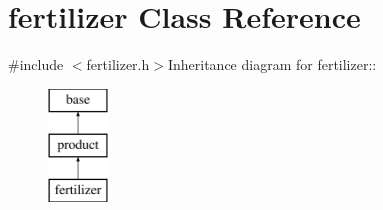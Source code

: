 \hypertarget{classfertilizer}{
\section{fertilizer Class Reference}
\label{classfertilizer}
}


{\ttfamily \#include $<$fertilizer.h$>$}Inheritance diagram for fertilizer::\begin{figure}[H]
\begin{center}
\leavevmode
\includegraphics[height=3cm]{classfertilizer}
\end{center}
\end{figure}
